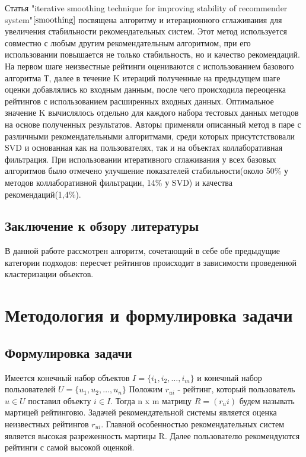\documentclass[12pt]{article} %
\begin{document}
\par
Статья "iterative smoothing technique for improving stability of recommender system"$\cite{smoothing}$ посвящена алгоритму и итерационного сглаживания для увеличения стабильности рекомендательных систем. Этот метод используется совместно с любым другим рекомендательным алгоритмом, при его использовании повышается не только стабильность, но и качество рекомендаций. На первом шаге неизвестные рейтинги оцениваются с использованием базового алгоритма Т, далее в течение K итераций полученные на предыдущем шаге оценки добавлялись ко входным данным, после чего происходила переоценка рейтингов с использованием расширенных входных данных. Оптимальное значение K вычислялось отдельно для каждого набора тестовых данных методов на основе полученных результатов. Авторы применяли описанный метод в паре с различными рекомендательными алгоритмами, среди которых присутстствовали SVD и основанная как на пользователях, так и на объектах коллаборативная фильтрация. При использовании итеративного сглаживания у всех базовых алгоритмов было отмечено улучшение показателей стабильности(около 50\% у методов коллаборативной фильтрации, 14\% у SVD) и качества рекомендаций(1,4\%). 

\subsection{Заключение к обзору литературы}
В данной работе рассмотрен алгоритм, сочетающий в себе обе предыдущие категории подходов: пересчет рейтингов происходит в зависимости проведенной кластеризации объектов.


\section{Методология и формулировка задачи}
\subsection{Формулировка задачи}
Имеется конечный набор объектов $I=\{i_{1}, i_{2}, \dots, i_{m}\}$ и конечный набор пользователей $U=\{u_{1}, u_{2}, \dots, u_{n}\}$
Положим $r_{ui}$ - рейтинг, который пользователь $u\in U$ поставил объекту $i\in I$. Тогда n x m матрицу  $R = (r_ui) $ будем называть мартицей рейтинговю. Задачей рекомендательной системы является оценка неизвестных рейтингов $r_{ui}$. Главной особенностью рекомендательных систем является высокая разреженность мартицы R.
Далее пользователю рекомендуются рейтинги с самой высокой оценкой. 
\end{document}
